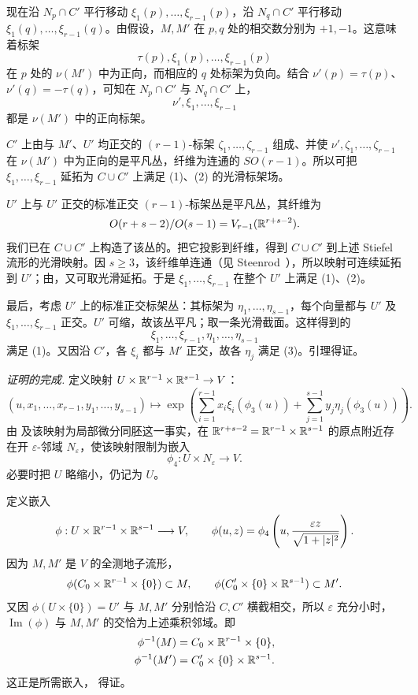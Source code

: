 现在沿 $N_p\cap C'$ 平行移动 $\xi_1(p),\ldots,\xi_{r-1}(p)$，沿 $N_q\cap C'$ 平行移动 $\xi_1(q),\ldots,\xi_{r-1}(q)$。由假设，$M,M'$ 在 $p,q$ 处的相交数分别为 $+1,-1$。这意味着标架
\[
  \tau(p),\xi_1(p),\ldots,\xi_{r-1}(p)
\]
在 $p$ 处的 $\nu(M')$ 中为正向，而相应的 $q$ 处标架为负向。结合
$\nu'(p)=\tau(p)$、$\nu'(q)=-\tau(q)$，可知在 $N_p\cap C'$ 与 $N_q\cap C'$ 上，
\[
  \nu',\xi_1,\ldots,\xi_{r-1}
\]
都是 $\nu(M')$ 中的正向标架。

$C'$ 上由与 $M'$、$U'$ 均正交的 $(r-1)$-标架
$\zeta_1,\ldots,\zeta_{r-1}$ 组成、并使
$\nu',\zeta_1,\ldots,\zeta_{r-1}$ 在 $\nu(M')$ 中为正向的是平凡丛，纤维为连通的 $SO(r-1)$。所以可把 $\xi_1,\ldots,\xi_{r-1}$ 延拓为 $C\cup C'$ 上满足 (1)、(2) 的光滑标架场。

$U'$ 上与 $U'$ 正交的标准正交 $(r-1)$-标架丛是平凡丛，其纤维为 
\[
  O(r+s-2)/O(s-1)
  =V_{r-1}(\mathbb{R}^{r+s-2}).
\]
我们已在 $C\cup C'$ 上构造了该丛的。把它投影到纤维，得到 $C\cup C'$ 到上述 Stiefel 流形的光滑映射。因 $s\geq3$，该纤维单连通（见 Steenrod~\cite[p.~103]{ref18}），所以映射可连续延拓到 $U'$；由，又可取光滑延拓。于是 $\xi_1,\ldots,\xi_{r-1}$ 在整个 $U'$ 上满足 (1)、(2)。

最后，考虑 $U'$ 上的标准正交标架丛：其标架为
$\eta_1,\ldots,\eta_{s-1}$，每个向量都与 $U'$ 及
$\xi_1,\ldots,\xi_{r-1}$ 正交。$U'$ 可缩，故该丛平凡；取一条光滑截面。这样得到的
\[
  \xi_1,\ldots,\xi_{r-1},
  \eta_1,\ldots,\eta_{s-1}
\]
满足 (1)。又因沿 $C'$，各 $\xi_i$ 都与 $M'$ 正交，故各 $\eta_j$ 满足 (3)。引理得证。
\EndProof

\par\medskip\noindent\textit{ 证明的完成.}\quad\label{proof:lemma6-7-page83}
定义映射 $U\times\mathbb{R}^{r-1}\times\mathbb{R}^{s-1}\to V$：
\[
  (u,x_1,\ldots,x_{r-1},y_1,\ldots,y_{s-1})
  \longmapsto
  \exp\left(
    \sum_{i=1}^{r-1}x_i\xi_i(\phi_3(u))
    +\sum_{j=1}^{s-1}y_j\eta_j(\phi_3(u))
  \right).
\]
由 及该映射为局部微分同胚这一事实，在
$\mathbb{R}^{r+s-2}=\mathbb{R}^{r-1}\times\mathbb{R}^{s-1}$ 的原点附近存在开 $\varepsilon$-邻域 $N_\varepsilon$，使该映射限制为嵌入
\[
  \phi_4:U\times N_\varepsilon\longrightarrow V.
\]
必要时把 $U$ 略缩小，仍记为 $U$。

定义嵌入
\[
  \phi:U\times\mathbb{R}^{r-1}\times\mathbb{R}^{s-1}\longrightarrow V,
  \qquad
  \phi(u,z)=\phi_4\left(u,\frac{\varepsilon z}{\sqrt{1+|z|^2}}\right).
\]
因为 $M,M'$ 是 $V$ 的全测地子流形，
\[
  \phi(C_0\times\mathbb{R}^{r-1}\times\{0\})\subset M,
  \qquad
  \phi(C'_0\times\{0\}\times\mathbb{R}^{s-1})\subset M'.
\]
又因 $\phi(U\times\{0\})=U'$ 与 $M,M'$ 分别恰沿 $C,C'$ 横截相交，所以 $\varepsilon$ 充分小时，$\operatorname{Im}(\phi)$ 与 $M,M'$ 的交恰为上述乘积邻域。即
\begin{align*}
  \phi^{-1}(M)&=C_0\times\mathbb{R}^{r-1}\times\{0\},\\
  \phi^{-1}(M')&=C'_0\times\{0\}\times\mathbb{R}^{s-1}.
\end{align*}
这正是所需嵌入， 得证。
\EndProof
